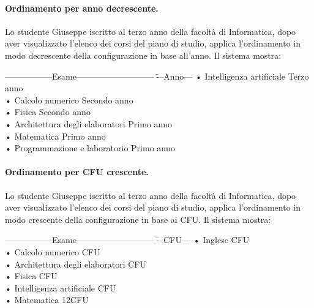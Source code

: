 \paragraph{Ordinamento per anno decrescente.}
Lo studente Giuseppe iscritto al terzo anno della facoltà di Informatica, dopo aver visualizzato l'elenco dei corsi del piano di studio, applica l'ordinamento in modo decrescente della configurazione in base all’anno. Il sistema mostra:
\begin{tabbing}
	\hspace{1cm}-----------------Esame--------------------------- \= ---Anno--- \kill
	\hspace{1cm} • Intelligenza artificiale \> Terzo anno\\
	\hspace{1cm} • Calcolo numerico \> Secondo anno\\
	\hspace{1cm} • Fisica \> Secondo anno\\
	\hspace{1cm} • Architettura degli elaboratori \> Primo anno\\
	\hspace{1cm} • Matematica  \>Primo anno\\
	\hspace{1cm} • Programmazione e laboratorio \> Primo anno\\
\end{tabbing}


\paragraph{Ordinamento per CFU crescente.}
Lo studente Giuseppe iscritto al terzo anno della facoltà di Informatica, dopo aver visualizzato l'elenco dei corsi del piano di studio, applica l'ordinamento in modo crescente della configurazione in base ai CFU. Il sistema mostra:
\begin{tabbing}
	\hspace{1cm}-----------------Esame--------------------------- \= ---CFU--- \kill
	\hspace{1cm} • Inglese  CFU\\
	\hspace{1cm} • Calcolo numerico   CFU\\
	\hspace{1cm} • Architettura degli elaboratori  CFU\\
	\hspace{1cm} • Fisica  CFU\\
	\hspace{1cm} • Intelligenza artificiale  CFU\\
	\hspace{1cm} • Matematica \> 12CFU\\
\end{tabbing}


